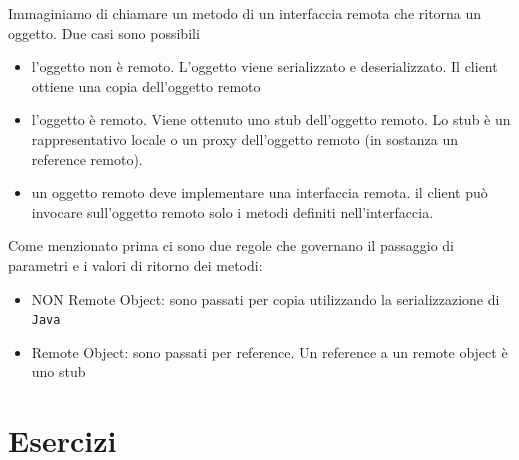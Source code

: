 \documentclass{article}
\begin{document}
Immaginiamo di chiamare un metodo di un interfaccia remota che ritorna un oggetto. Due casi sono possibili
\begin{itemize}
\item l'oggetto non \`e remoto. L'oggetto viene serializzato e deserializzato. Il client ottiene una copia dell'oggetto remoto
\item l'oggetto \`e remoto. Viene ottenuto uno stub dell'oggetto remoto. Lo stub \`e un rappresentativo locale o un proxy dell'oggetto remoto (in sostanza un reference remoto).
\item un oggetto remoto deve implementare una interfaccia remota. il client pu\`o invocare sull'oggetto remoto solo i metodi definiti nell'interfaccia.
\end{itemize}


Come menzionato prima ci sono due regole che governano il passaggio di parametri e i valori di ritorno dei metodi:
\begin{itemize}
\item NON Remote Object: sono passati per copia utilizzando la serializzazione di \texttt{Java} 
\item Remote Object: sono passati per reference. Un reference a un remote object \`e uno stub
\end{itemize}

\newpage

\section{Esercizi}
\end{document}

